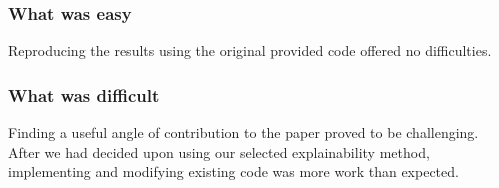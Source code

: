 \subsubsection*{What was easy}
Reproducing the results using the original provided code offered no difficulties.

\subsubsection*{What was difficult}
Finding a useful angle of contribution to the paper proved to be challenging. After we had decided upon using our selected explainability method, implementing and modifying existing code was more work than expected.


